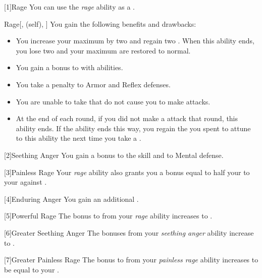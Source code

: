         [1]{Rage} You can use the \textit{rage} ability as a .
        \begin{attuneability}{Rage}[,  (self), ]
            You gain the following benefits and drawbacks:
            \begin{itemize}
                \item You increase your maximum  by two and regain two .
                    When this ability ends, you lose two  and your maximum  are restored to normal.
                \item You gain a  bonus to  with  abilities.
                \item You take a  penalty to Armor and Reflex defenses.
                \item You are unable to take  that do not cause you to make  attacks.
                \item At the end of each round, if you did not make a  attack that round, this ability ends.
                    If the ability ends this way, you regain the  you spent to attune to this ability the next time you take a .
            \end{itemize}
        \end{attuneability}

        [2]{Seething Anger}
        You gain a  bonus to the  skill and to Mental defense.

        [3]{Painless Rage} Your \textit{rage} ability also grants you a bonus equal to half your  to your  against .

        [4]{Enduring Anger} You gain an additional .

        [5]{Powerful Rage} The bonus to  from your \textit{rage} ability increases to .

        [6]{Greater Seething Anger}
        The bonuses from your \textit{seething anger} ability increase to .

        [7]{Greater Painless Rage} The bonus to  from your \textit{painless rage} ability increases to be equal to your .

